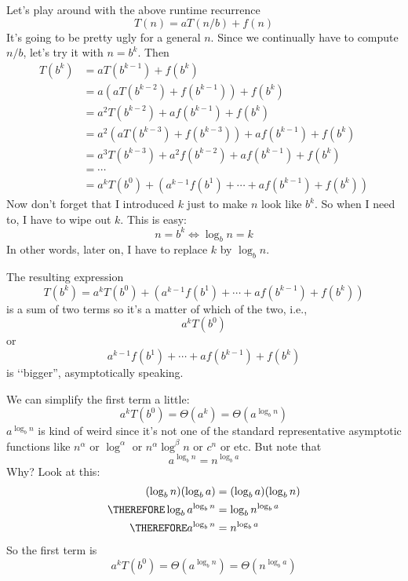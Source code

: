 \newpage
Let's play around with the above runtime recurrence
\[
T(n)
= a T(n/b) + f(n)
\]
It's going to be pretty ugly for a general $n$.
Since we continually have to compute $n/b$, let's try it with $n = b^k$.
Then
\begin{align*}
T(b^k)
&= a T \left( b^{k-1} \right) + f(b^k) \\
&= a \left( a T \left( b^{k-2} \right) + f(b^{k-1}) \right)+ f(b^k) \\ 
&= a^2 T \left( b^{k-2} \right) + a f(b^{k-1}) + f(b^k) \\
&= a^2 \left( a T \left( b^{k-3} \right) + f(b^{k-3}) \right) + a f(b^{k-1})
   + f(b^k) \\ 
&= a^3 T \left( b^{k-3} \right) + a^2 f(b^{k-2}) + a f(b^{k-1}) + f(b^k) \\
&= \cdots \\
&= a^k T \left( b^0 \right)
   + \left( a^{k-1} f(b^1) + \cdots + a f(b^{k-1}) + f(b^k) \right)
\end{align*}
Now don't forget that I introduced $k$ just to make $n$ look like $b^k$.
So when I need to, I have to wipe out $k$.
This is easy:
\[
n = b^k \iff \log_b n = k
\]
In other words, later on, I have to replace $k$ by $\log_b n$.

The resulting expression
\[
T(b^k)
= a^k T \left( b^0 \right)
   + \left( a^{k-1} f(b^1) + \cdots + a f(b^{k-1}) + f(b^k) \right)
\]
is a sum of two terms so it's a matter of
which of the two, i.e.,
\[
a^k T \left( b^0 \right)
\]
or
\[
   a^{k-1} f(b^1) + \cdots + a f(b^{k-1}) + f(b^k) 
\]
is \lq\lq bigger'', asymptotically speaking.

We can simplify the first term a little:
\[
a^k T \left( b^0 \right) = \Theta (a^k) = \Theta (a^{\log_b n})
\]
$a^{\log_b n}$ is kind of weird since it's not one of the
standard representative asymptotic functions like $n^\alpha$
or $\log^\alpha$ or $n^\alpha \log^\beta n$ or $c^n$ or etc.
But note that
\[
a^{\log_b n} = n^{\log_b a}
\]
Why? Look at this:
\begin{align*}
(\log_b n)(\log_b a) &= (\log_b a)(\log_b n) \\
\THEREFORE \log_b a^{\log_b n} &= \log_b n^{\log_b a} \\
\THEREFORE a^{\log_b n} &= n^{\log_b a} 
\end{align*}
So the first term is
\[
a^k T \left( b^0 \right)
= \Theta \left( a^{\log_b n} \right)
= \Theta \left( n^{\log_b a} \right)
\]

